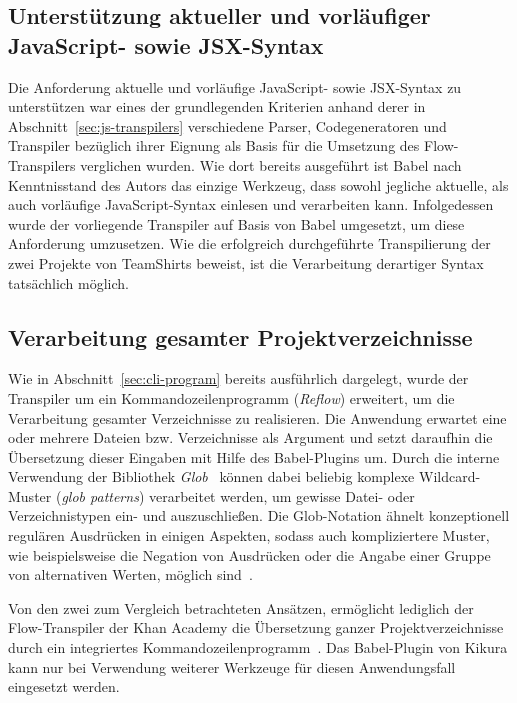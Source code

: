 \subsection{Unterstützung aktueller und vorläufiger JavaScript- sowie JSX-Syntax}

Die Anforderung aktuelle und vorläufige JavaScript- sowie JSX-Syntax zu unterstützen war eines der grundlegenden Kriterien anhand derer in Abschnitt~\ref{sec:js-transpilers} verschiedene Parser, Codegeneratoren und Transpiler bezüglich ihrer Eignung als Basis für die Umsetzung des Flow-Transpilers verglichen wurden. Wie dort bereits ausgeführt ist Babel nach Kenntnisstand des Autors das einzige Werkzeug, dass sowohl jegliche aktuelle, als auch vorläufige JavaScript-Syntax einlesen und verarbeiten kann. Infolgedessen wurde der vorliegende Transpiler auf Basis von Babel umgesetzt, um diese Anforderung umzusetzen. Wie die erfolgreich durchgeführte Transpilierung der zwei Projekte von TeamShirts beweist, ist die Verarbeitung derartiger Syntax tatsächlich möglich.


\subsection{Verarbeitung gesamter Projektverzeichnisse}

Wie in Abschnitt~\ref{sec:cli-program} bereits ausführlich dargelegt, wurde der Transpiler um ein Kommandozeilenprogramm (\textit{Reflow}) erweitert, um die Verarbeitung gesamter Verzeichnisse zu realisieren. Die Anwendung erwartet eine oder mehrere Dateien bzw. Verzeichnisse als Argument und setzt daraufhin die Übersetzung dieser Eingaben mit Hilfe des Babel-Plugins um.
Durch die interne Verwendung der Bibliothek \textit{Glob}~\autocite{NPM:GLOB} können dabei beliebig komplexe Wildcard-Muster (\textit{glob patterns}) verarbeitet werden, um gewisse Datei- oder Verzeichnistypen ein- und auszuschließen. Die Glob-Notation ähnelt konzeptionell regulären Ausdrücken in einigen Aspekten, sodass auch kompliziertere Muster, wie beispielsweise die Negation von Ausdrücken oder die Angabe einer Gruppe von alternativen Werten, möglich sind~\autocite{MAN:GLOB}.

Von den zwei zum Vergleich betrachteten Ansätzen, ermöglicht lediglich der Flow-Transpiler der Khan Academy die Übersetzung ganzer Projektverzeichnisse durch ein integriertes Kommandozeilenprogramm~\autocite{KHAN:FLOW_TO_TS}. Das Babel-Plugin von Kikura kann nur bei Verwendung weiterer Werkzeuge für diesen Anwendungsfall eingesetzt werden.

